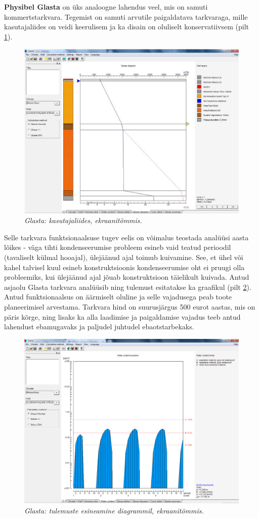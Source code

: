 \textbf{Physibel Glasta} on üks analoogne lahendus veel, mis on samuti kommertstarkvara. Tegemist on samuti arvutile paigaldatava tarkvaraga, mille
kasutajaliides on veidi keerulisem ja ka disain on oluliselt konservatiivsem (pilt \ref{fig:glasta_sample}). 
\begin{figure}[ht]
    \centering
    \includegraphics[width=.6\textwidth]{figures/problem_statement/09_glasta_sample.png}
    \caption[Physibel Glasta kasutajaliides, ekraanitõmmis]{\textit{Glasta: kasutajaliides, ekraanitõmmis.}}
    \label{fig:glasta_sample}
\end{figure}

Selle tarkvara funktsionaalsuse tugev eelis on võimalus teostada analüüsi aasta lõikes - väga tihti 
kondenseerumise probleem esineb vaid teatud perioodil (tavaliselt külmal hooajal),
ülejäänud ajal toimub kuivamine. See, et ühel või kahel talvisel kuul esineb konstruktsioonis kondenseerumise oht ei pruugi
olla probleemiks, kui ülejäänud ajal jõuab konstruktsioon täielikult kuivada. Antud asjaolu Glasta tarkvara analüüsib ning 
tulemust esitatakse ka graafikul (pilt \ref{fig:glasta_results}). Antud funktsionaalsus on äärmiselt oluline ja selle vajadusega peab toote 
planeerimisel arvestama. Tarkvara hind on suurusjärgus 500 eurot aastas, mis on päris kõrge, ning lisaks ka alla laadimise ja 
paigaldamise vajadus teeb antud lahendust ebamugavaks ja paljudel juhtudel ebaotstarbekaks.
\begin{figure}[ht]
    \centering
    \includegraphics[width=.6\textwidth]{figures/problem_statement/10_glasta_results.png}
    \caption[Physibel Glasta tulemuste esitamine diagrammil, ekraanitõmmis]{\textit{Glasta: tulemuste esineamine diagrammil, ekraanitõmmis.}}
    \label{fig:glasta_results}
\end{figure}

